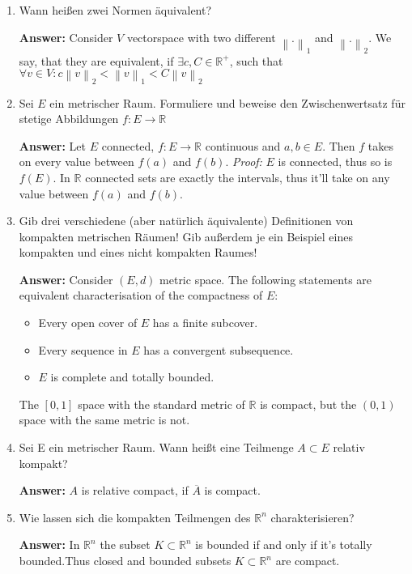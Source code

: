 \documentclass[11pt]{article}
\newcommand{\norm}[1]{\left\lVert#1\right\rVert}
\newcommand{\RR}[0]{\mathbb{R}}
\begin{document}
\begin{enumerate}
    \item Wann heißen zwei Normen äquivalent?

    \textbf{Answer:} Consider $V$ vectorspace with two different $\norm{.}_1$ and $\norm{.}_2$. We say, that they are equivalent, if $\exists c, C \in \RR^+$, such that $\forall v \in V\colon c \norm{v}_2 < \norm{v}_1 < C \norm{v}_2$

    \item Sei $E$ ein metrischer Raum. Formuliere und beweise den Zwischenwertsatz für stetige Abbildungen $f\colon E \to \RR$

    \textbf{Answer:} Let $E$ connected, $f\colon E \to \RR$ continuous and $a, b \in E$. Then $f$ takes on every value between $f(a)$ and $f(b)$. \textit{Proof:} $E$ is connected, thus so is $f(E)$. In $\RR$ connected sets are exactly the intervals, thus it'll take on any value between $f(a)$ and $f(b)$.

    \item Gib drei verschiedene (aber natürlich äquivalente) Definitionen von kompakten metrischen Räumen! Gib außerdem je ein Beispiel eines kompakten und eines nicht kompakten Raumes!

    \textbf{Answer:} Consider $(E, d)$ metric space. The following statements are equivalent characterisation of the compactness of $E$:
    \begin{itemize}
        \item Every open cover of $E$ has a finite subcover.
        \item Every sequence in $E$ has a convergent subsequence.
        \item $E$ is complete and totally bounded.
    \end{itemize}

    The $[0, 1]$ space with the standard metric of $\RR$ is compact, but the $(0, 1)$ space with the same metric is not.

    \item Sei E ein metrischer Raum. Wann heißt eine Teilmenge $A \subset E$ relativ kompakt?

    \textbf{Answer:} $A$ is relative compact, if $\overline{A}$ is compact.

    \item Wie lassen sich die kompakten Teilmengen des $\RR^n$
    charakterisieren?

    \textbf{Answer:} In $\RR^n$ the subset $K \subset \RR^n$ is bounded if and only if it's totally bounded.Thus closed and bounded subsets $K \subset \RR^n$ are compact.


\end{enumerate}
\end{document}
